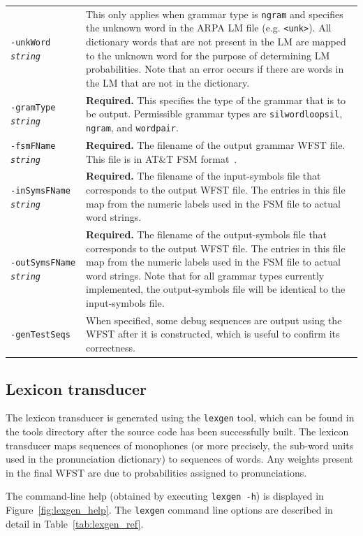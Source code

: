 \documentclass[a4paper,12pt]{report}
\begin{document}
\begin{center}
\begin{longtable}{lp{9cm}}
{\tt -unkWord \emph{string}} & This only applies when grammar type is {\tt ngram} and specifies the unknown word in the ARPA LM file (e.g. {\tt <unk>}). All dictionary words that are not present in the LM are mapped to the unknown word for the purpose of determining LM probabilities. Note that an error occurs if there are words in the LM that are not in the dictionary. \\
{\tt -gramType \emph{string}} & {\bf Required.} This specifies the type of the grammar that is to be output. Permissible grammar types are {\tt silwordloopsil}, {\tt ngram}, and {\tt wordpair}. \\
{\tt -fsmFName \emph{string}} & {\bf Required.} The filename of the output grammar WFST file. This file is in AT\&T FSM format~\cite{attfsmformats}. \\
{\tt -inSymsFName \emph{string}} & {\bf Required.} The filename of the input-symbols file that corresponds to the output WFST file. The entries in this file map from the numeric labels used in the FSM file to actual word strings. \\
{\tt -outSymsFName \emph{string}} & {\bf Required.} The filename of the output-symbols file that corresponds to the output WFST file. The entries in this file map from the numeric labels used in the FSM file to actual word strings. Note that for all grammar types currently implemented, the output-symbols file will be identical to the input-symbols file. \\
{\tt -genTestSeqs} & When specified, some debug sequences are output using the WFST after it is constructed, which is useful to confirm its correctness.
\label{tab:gramgen_options}
\end{longtable}
\end{center}

\subsection{Lexicon transducer}
\label{sec:lexgen}

The lexicon transducer is generated using the {\tt lexgen} tool, which can be
found in the tools directory after the source code has been successfully built.
The lexicon transducer maps sequences of monophones (or more precisely, the
sub-word units used in the pronunciation dictionary) to sequences of words. Any
weights present in the final WFST are due to probabilities assigned to
pronunciations.

The command-line help (obtained by executing {\tt lexgen -h}) is displayed in Figure~\ref{fig:lexgen_help}. 
The {\tt lexgen} command line options are described in detail in Table~\ref{tab:lexgen_ref}.
\end{document}

